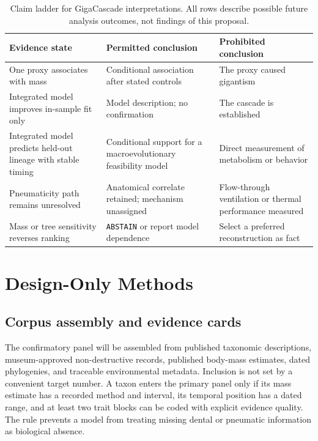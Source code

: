 \documentclass[conference]{IEEEtran}
\newcommand{\gc}{GigaCascade}
\newcommand{\abstain}{\texttt{ABSTAIN}}
\begin{document}
\begin{table}[!t]
\caption{Claim ladder for \gc{} interpretations. All rows describe possible future analysis outcomes, not findings of this proposal.}
\label{tab:claims}
\centering
\scriptsize
\begin{tabular}{|p{}|p{}|p{}|}
\hline
Evidence state & Permitted conclusion & Prohibited conclusion \\
\hline
One proxy associates with mass & Conditional association after stated controls & The proxy caused gigantism \\
\hline
Integrated model improves in-sample fit only & Model description; no confirmation & The cascade is established \\
\hline
Integrated model predicts held-out lineage with stable timing & Conditional support for a macroevolutionary feasibility model & Direct measurement of metabolism or behavior \\
\hline
Pneumaticity path remains unresolved & Anatomical correlate retained; mechanism unassigned & Flow-through ventilation or thermal performance measured \\
\hline
Mass or tree sensitivity reverses ranking & \abstain{} or report model dependence & Select a preferred reconstruction as fact \\
\hline
\end{tabular}
\end{table}

\section{Design-Only Methods}

\subsection{Corpus assembly and evidence cards}

The confirmatory panel will be assembled from published taxonomic descriptions, museum-approved non-destructive records, published body-mass estimates, dated phylogenies, and traceable environmental metadata. Inclusion is not set by a convenient target number. A taxon enters the primary panel only if its mass estimate has a recorded method and interval, its temporal position has a dated range, and at least two trait blocks can be coded with explicit evidence quality. The rule prevents a model from treating missing dental or pneumatic information as biological absence.
\end{document}
